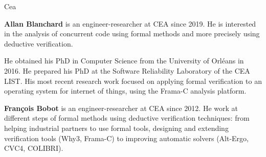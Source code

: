 \begin{sitedescription}{Cea}
\begin{compactitem} %

\item{\bf Allan Blanchard} is an engineer-researcher at CEA since 2019. He is
  interested in the analysis of concurrent code using formal methods and more
  precisely using deductive verification.

  He obtained his PhD in Computer Science from the University of Orléans in
  2016. He prepared his PhD at the Software Reliability Laboratory of the CEA
  LIST. His most recent research work focused on applying formal verification to
  an operating system for internet of things, using the Frama-C analysis
  platform.

\item{\bf François Bobot} is an engineer-researcher at CEA since 2012. He work
  at different steps of formal methods using deductive verification techniques:
  from helping industrial partners to use formal tools, designing and extending
  verification tools (Why3, Frama-C) to improving automatic solvers (Alt-Ergo,
  CVC4, COLIBRI).
\end{compactitem}

\end{sitedescription}


